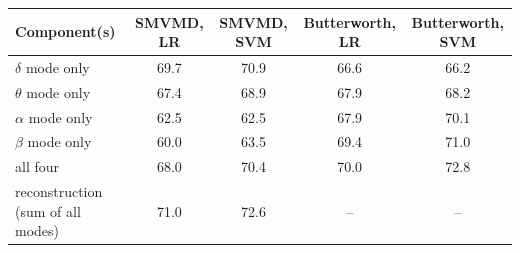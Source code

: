 \small
\begin{tabular}{lcccc}
\hline
Component(s) & SMVMD, LR & SMVMD, SVM & Butterworth, LR & Butterworth, SVM \\
\hline
$\delta$ mode only & 69.7 & 70.9 & 66.6 & 66.2 \\
$\theta$ mode only & 67.4 & 68.9 & 67.9 & 68.2 \\
$\alpha$ mode only & 62.5 & 62.5 & 67.9 & 70.1 \\
$\beta$ mode only & 60.0 & 63.5 & 69.4 & 71.0 \\
all four & 68.0 & 70.4 & 70.0 & 72.8 \\
reconstruction (sum of all modes) & 71.0 & 72.6 & -- & -- \\
\hline
\end{tabular}
